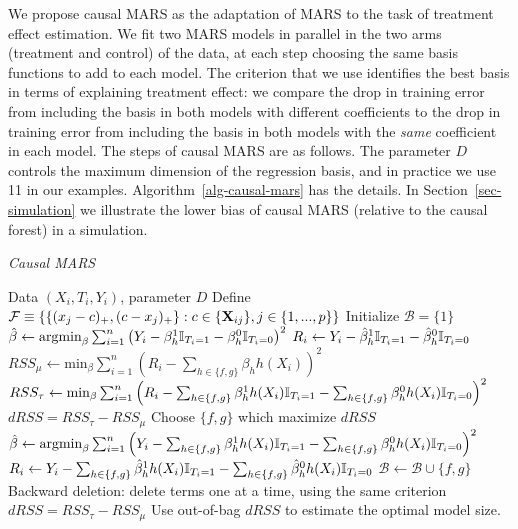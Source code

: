 \documentclass{article}
\def\B{\mathcal{B}}
\def\l{\left}\def\r{\right}\def\lf{\lfloor}\def\rf{\rfloor}
\begin{document}
We propose causal MARS as the adaptation of MARS to the task of treatment
effect estimation. We fit two MARS models in parallel in the two arms
(treatment and control) of the data, at each step choosing the same basis
functions to add to each model. The criterion that we use identifies the best
basis in terms of explaining treatment effect: we compare the drop in training
error from including the basis in both models with different coefficients to
the drop in training error from including the basis in both models with the
{\it same} coefficient in each model. The steps of causal MARS are as follows.
The parameter $D$ controls the maximum dimension of the regression basis, and
in practice we use 11 in our examples. Algorithm~\ref{alg-causal-mars} has the
details. In Section~\ref{sec-simulation} we illustrate the lower bias of causal
MARS (relative to the causal forest) in a simulation.

\begin{algorithm}
\caption{\it Causal MARS}
\label{alg-causal-mars}
\begin{algorithmic}
  \REQUIRE Data $(X_i, T_i, Y_i)$, parameter $D$
  \STATE Define $\mathcal{F} \equiv
    \{\{(x_j - c)_+, (c - x_j)_+\}:c \in \{\mathbf{X}_{ij}\}, j \in \{1, ..., p\}\}$
  \STATE Initialize $\B = \{1\}$
  \STATE $\hat\beta \leftarrow \mbox{argmin}_\beta\sum_{i = 1}^n
          \l(Y_i - \beta_h^1\mI_{T_i = 1} - \beta_h^0\mI_{T_i = 0}\r)^2$
  \STATE $R_i \leftarrow Y_i
            - \hat\beta_h^1\mathbb{I}_{T_i = 1} - \hat\beta_h^0\mathbb{I}_{T_i = 0}$
    \FOR{$\{f, g\}$ in
      $\{\{b(x)f^*(x), b(x)g^*(x)\}:b \in \B, \{f^*, g^*\} \in \F\}$}
      \STATE
        $RSS_\mu \leftarrow \mbox{min}_\beta\sum_{i = 1}^n
          \l(R_i - \sum_{h \in \{f, g\}}\beta_hh(X_i)\r)^2$
      \STATE
        $RSS_\tau \leftarrow \mbox{min}_\beta\sum_{i = 1}^n
          \l(R_i - \sum_{h \in \{f, g\}}\beta_h^1h(X_i)\mI_{T_i = 1}
            - \sum_{h \in \{f, g\}}\beta_h^0h(X_i)\mI_{T_i = 0}\r)^2$
      \STATE $dRSS = RSS_\tau - RSS_\mu$
    \ENDFOR
    \STATE Choose $\{f, g\}$ which maximize $dRSS$
    \STATE $\hat\beta \leftarrow \mbox{argmin}_\beta\sum_{i = 1}^n
          \l(Y_i - \sum_{h \in \{f, g\}}\beta_h^1h(X_i)\mI_{T_i = 1}
            - \sum_{h \in \{f, g\}}\beta_h^0h(X_i)\mI_{T_i = 0}\r)^2$
    \STATE $R_i \leftarrow Y_i
            - \sum_{h \in \{f, g\}}\hat\beta_h^1h(X_i)\mathbb{I}_{T_i = 1}
            - \sum_{h \in \{f, g\}}\hat\beta_h^0h(X_i)\mathbb{I}_{T_i = 0}$
    \STATE $\B \leftarrow \B \cup \{f, g\}$
  \ENDFOR
  \STATE Backward deletion: delete terms one at a time, using the same
    criterion $dRSS = RSS_\tau - RSS_\mu$
  \STATE Use out-of-bag $dRSS$ to estimate the optimal model size.
\end{algorithmic}
\end{algorithm}
\end{document}
